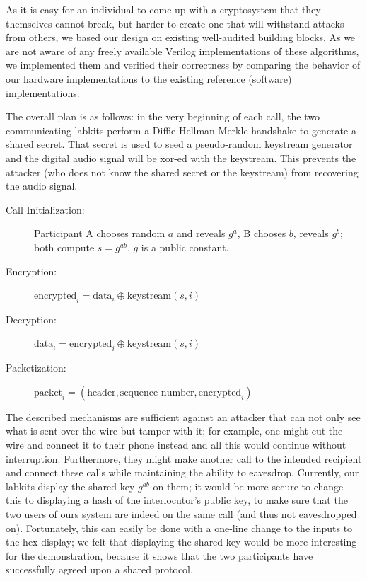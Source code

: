 \documentclass[a4paper]{report}
\begin{document}
As it is easy for an individual to come up with a cryptosystem that they
themselves cannot break, but harder to create one that will %
withstand attacks
from others, we based our design on existing well-audited building
blocks. As we are not aware of any freely available Verilog implementations of
these algorithms, we implemented them and verified their correctness by
comparing the behavior of our hardware implementations to the existing reference
(software) implementations.

The overall plan is as follows: in the very beginning of each call, the two
communicating labkits perform a Diffie-Hellman-Merkle handshake to generate a
shared secret. That secret is used to seed a pseudo-random keystream
generator and the digital audio signal will be xor-ed with the keystream.
This prevents the attacker (who does not know the shared secret or the
keystream) from recovering the audio signal. 

\begin{description}
  \item[Call Initialization:] Participant A chooses random $a$ and reveals $g^a$,
	  B chooses $b$, reveals $g^b$; both compute $s=g^{ab}$. $g$ is a public constant.
  \item[Encryption:] $\text{encrypted}_i = \text{data}_i \mathbin{\oplus} \text{keystream}(s,i)$
  \item[Decryption:] $\text{data}_i = \text{encrypted}_i \mathbin{\oplus} \text{keystream}(s,i)$
  \item[Packetization:] $\text{packet}_i = (\text{header}, \text{sequence number}, \text{encrypted}_i)$
\end{description}

The described mechanisms are sufficient against an attacker that can not only see
what is sent over the wire but tamper with it; for example, one might cut the
wire and connect it to their phone instead and all this would continue without
interruption. Furthermore, they might make another call to the intended
recipient and connect these calls while maintaining the ability to eavesdrop. Currently, our labkits display the shared key $g^{ab}$ on them; it would be more secure to change this to displaying a hash of the interlocutor's public key, to
make sure that the two users of ours system are indeed on the same call (and
thus not eavesdropped on). Fortunately, this can easily be done with a one-line change to the inputs to the hex display; we felt that displaying the shared key would be more interesting for the demonstration, because it shows that the two participants have successfully agreed upon a shared protocol. 
\end{document}
